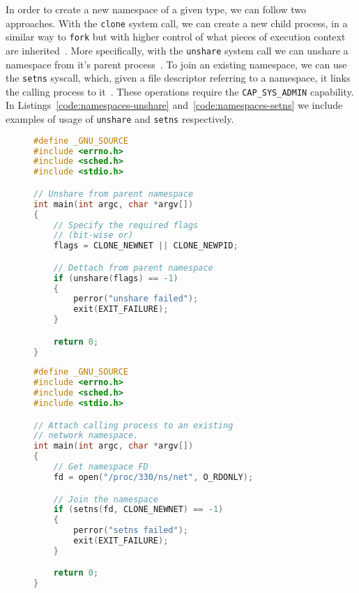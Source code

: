 In order to create a new namespace of a given type, we can follow two approaches.
With the \texttt{clone} system call, we can create a new child process, in a similar way to \texttt{fork} but with higher control of what pieces of execution context are inherited~\cite{clone-manual}.
More specifically, with the \texttt{unshare} system call we can unshare a namespace from it's parent process~\cite{unshare-manual}.
To join an existing namespace, we can use the \texttt{setns} syscall, which, given a file descriptor referring to a namespace, it links the calling process to it~\cite{setns-manual}.
These operations require the \texttt{CAP\_SYS\_ADMIN} capability.
In Listings~\ref{code:namespaces-unshare} and~\ref{code:namespaces-setns} we include examples of usage of \texttt{unshare} and \texttt{setns} respectively.
\begin{figure}[h!]
    \begin{minipage}{.45\textwidth}
        \begin{lstlisting}[language=C,caption={Snippet to unshare the calling thread from a namespace using \texttt{unshare}.},label={code:namespaces-unshare}]
#define _GNU_SOURCE
#include <errno.h>
#include <sched.h>
#include <stdio.h>

// Unshare from parent namespace
int main(int argc, char *argv[])
{
    // Specify the required flags
    // (bit-wise or)
    flags = CLONE_NEWNET || CLONE_NEWPID;

    // Dettach from parent namespace
    if (unshare(flags) == -1)
    {
        perror("unshare failed");
        exit(EXIT_FAILURE);        
    }

    return 0;
}
\end{lstlisting}
    \end{minipage} \hfill
    \begin{minipage}{.45\textwidth}
        \begin{lstlisting}[language=C,caption={Snippet to attach to an existing network namespace.},label={code:namespaces-setns}]
#define _GNU_SOURCE
#include <errno.h>
#include <sched.h>
#include <stdio.h>

// Attach calling process to an existing
// network namespace.
int main(int argc, char *argv[])
{
    // Get namespace FD
    fd = open("/proc/330/ns/net", O_RDONLY);

    // Join the namespace
    if (setns(fd, CLONE_NEWNET) == -1)
    {
        perror("setns failed");
        exit(EXIT_FAILURE);        
    }

    return 0;
}
\end{lstlisting}
    \end{minipage}
\end{figure}


